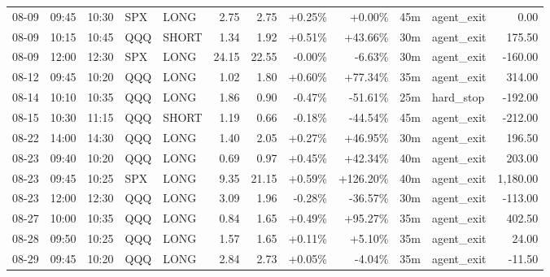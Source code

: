 \documentclass[11pt,a4paper,twoside]{article}
\begin{document}
\begin{center}
\begin{longtable}{>{\color{txtmain}}l l l l l r r r r r >{\color{txtmain}}l r}
08-09 & 09:45 & 10:30 & SPX & LONG & 2.75 & 2.75 & \textcolor{wingreen}{+0.25\%} & \textcolor{wingreen}{+0.00\%} & 45m & agent\_exit & \textcolor{wingreen}{0.00} \\
08-09 & 10:15 & 10:45 & QQQ & SHORT & 1.34 & 1.92 & \textcolor{wingreen}{+0.51\%} & \textcolor{wingreen}{+43.66\%} & 30m & agent\_exit & \textcolor{wingreen}{175.50} \\
08-09 & 12:00 & 12:30 & SPX & LONG & 24.15 & 22.55 & \textcolor{lossred}{-0.00\%} & \textcolor{lossred}{-6.63\%} & 30m & agent\_exit & \textcolor{lossred}{-160.00} \\
08-12 & 09:45 & 10:20 & QQQ & LONG & 1.02 & 1.80 & \textcolor{wingreen}{+0.60\%} & \textcolor{wingreen}{+77.34\%} & 35m & agent\_exit & \textcolor{wingreen}{314.00} \\
08-14 & 10:10 & 10:35 & QQQ & LONG & 1.86 & 0.90 & \textcolor{lossred}{-0.47\%} & \textcolor{lossred}{-51.61\%} & 25m & hard\_stop & \textcolor{lossred}{-192.00} \\
08-15 & 10:30 & 11:15 & QQQ & SHORT & 1.19 & 0.66 & \textcolor{lossred}{-0.18\%} & \textcolor{lossred}{-44.54\%} & 45m & agent\_exit & \textcolor{lossred}{-212.00} \\
08-22 & 14:00 & 14:30 & QQQ & LONG & 1.40 & 2.05 & \textcolor{wingreen}{+0.27\%} & \textcolor{wingreen}{+46.95\%} & 30m & agent\_exit & \textcolor{wingreen}{196.50} \\
08-23 & 09:40 & 10:20 & QQQ & LONG & 0.69 & 0.97 & \textcolor{wingreen}{+0.45\%} & \textcolor{wingreen}{+42.34\%} & 40m & agent\_exit & \textcolor{wingreen}{203.00} \\
08-23 & 09:45 & 10:25 & SPX & LONG & 9.35 & 21.15 & \textcolor{wingreen}{+0.59\%} & \textcolor{wingreen}{+126.20\%} & 40m & agent\_exit & \textcolor{wingreen}{1,180.00} \\
08-23 & 12:00 & 12:30 & QQQ & LONG & 3.09 & 1.96 & \textcolor{lossred}{-0.28\%} & \textcolor{lossred}{-36.57\%} & 30m & agent\_exit & \textcolor{lossred}{-113.00} \\
08-27 & 10:00 & 10:35 & QQQ & LONG & 0.84 & 1.65 & \textcolor{wingreen}{+0.49\%} & \textcolor{wingreen}{+95.27\%} & 35m & agent\_exit & \textcolor{wingreen}{402.50} \\
08-28 & 09:50 & 10:25 & QQQ & LONG & 1.57 & 1.65 & \textcolor{wingreen}{+0.11\%} & \textcolor{wingreen}{+5.10\%} & 35m & agent\_exit & \textcolor{wingreen}{24.00} \\
08-29 & 09:45 & 10:20 & QQQ & LONG & 2.84 & 2.73 & \textcolor{wingreen}{+0.05\%} & \textcolor{lossred}{-4.04\%} & 35m & agent\_exit & \textcolor{lossred}{-11.50} \\

\end{longtable}
\end{center}
\end{document}
